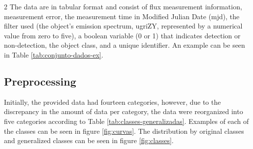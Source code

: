\documentclass[a4paper,twoside,12pt]{article}
\begin{document}
\begin{multicols}{2}
The data are in tabular format and consist of flux measurement information, measurement error, the measurement time in Modified Julian Date (mjd), the filter used (the object's emission spectrum, ugriZY, represented by a numerical value from zero to five), a boolean variable (0 or 1) that indicates detection or non-detection, the object class, and a unique identifier. An example can be seen in Table \ref{tab:conjunto-dados-ex}.

\begin{center}
\begin{minipage}{\columnwidth}
\centering
\setlength{\tabcolsep}{2pt}     %
\renewcommand{\arraystretch}{1.1}
\footnotesize                   %
\label{tab:conjunto-dados-ex}
\end{minipage}
\end{center}

\subsection{Preprocessing}

Initially, the provided data had fourteen categories, however, due to the discrepancy in the amount of data per category, the data were reorganized into five categories according to Table \ref{tab:classes-generalizadas}. Examples of each of the classes can be seen in figure \ref{fig:curvas}. The distribution by original classes and generalized classes can be seen in figure \ref{fig:classes}.


\end{multicols}
\end{document}
